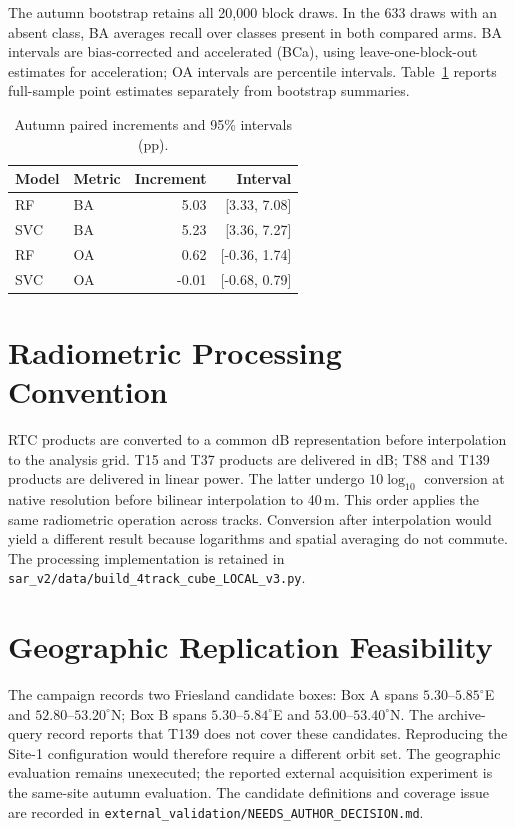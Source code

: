 \documentclass[journal]{IEEEtran}
\begin{document}
The autumn bootstrap retains all 20,000 block draws. In the 633 draws with an absent class, BA averages recall over classes present in both compared arms. BA intervals are bias-corrected and accelerated (BCa), using leave-one-block-out estimates for acceleration; OA intervals are percentile intervals. Table~\ref{tab:autumn} reports full-sample point estimates separately from bootstrap summaries.
\begin{table}[!t]\centering\footnotesize
\caption{Autumn paired increments and 95\% intervals (pp).}\label{tab:autumn}
\begin{tabular}{llrr}\toprule
Model & Metric & Increment & Interval \\\midrule
RF & BA & 5.03 & [3.33, 7.08] \\
SVC & BA & 5.23 & [3.36, 7.27] \\
RF & OA & 0.62 & [-0.36, 1.74] \\
SVC & OA & -0.01 & [-0.68, 0.79] \\\bottomrule
\end{tabular}\end{table}

\section{Radiometric Processing Convention}
RTC products are converted to a common dB representation before interpolation to the analysis grid. T15 and T37 products are delivered in dB; T88 and T139 products are delivered in linear power. The latter undergo $10\log_{10}$ conversion at native resolution before bilinear interpolation to 40\,m. This order applies the same radiometric operation across tracks. Conversion after interpolation would yield a different result because logarithms and spatial averaging do not commute. The processing implementation is retained in \texttt{sar\_v2/data/}\allowbreak\texttt{build\_4track\_cube\_LOCAL\_v3.py}.

\section{Geographic Replication Feasibility}
The campaign records two Friesland candidate boxes: Box A spans $5.30$--$5.85^\circ$E and $52.80$--$53.20^\circ$N; Box B spans $5.30$--$5.84^\circ$E and $53.00$--$53.40^\circ$N. The archive-query record reports that T139 does not cover these candidates. Reproducing the Site-1 configuration would therefore require a different orbit set. The geographic evaluation remains unexecuted; the reported external acquisition experiment is the same-site autumn evaluation. The candidate definitions and coverage issue are recorded in \texttt{external\_validation/}\allowbreak\texttt{NEEDS\_AUTHOR\_DECISION.md}.
\end{document}
